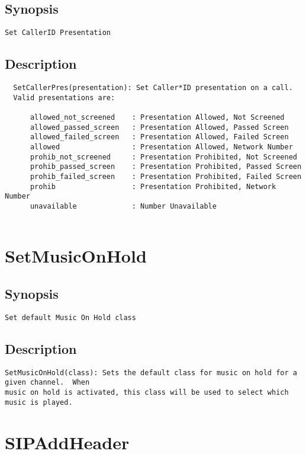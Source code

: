 \subsection{Synopsis}
\begin{verbatim}
Set CallerID Presentation
\end{verbatim}
\subsection{Description}
\begin{verbatim}
  SetCallerPres(presentation): Set Caller*ID presentation on a call.
  Valid presentations are:

      allowed_not_screened    : Presentation Allowed, Not Screened
      allowed_passed_screen   : Presentation Allowed, Passed Screen
      allowed_failed_screen   : Presentation Allowed, Failed Screen
      allowed                 : Presentation Allowed, Network Number
      prohib_not_screened     : Presentation Prohibited, Not Screened
      prohib_passed_screen    : Presentation Prohibited, Passed Screen
      prohib_failed_screen    : Presentation Prohibited, Failed Screen
      prohib                  : Presentation Prohibited, Network Number
      unavailable             : Number Unavailable


\end{verbatim}


\section{SetMusicOnHold}
\subsection{Synopsis}
\begin{verbatim}
Set default Music On Hold class
\end{verbatim}
\subsection{Description}
\begin{verbatim}
SetMusicOnHold(class): Sets the default class for music on hold for a given channel.  When
music on hold is activated, this class will be used to select which
music is played.

\end{verbatim}


\section{SIPAddHeader}
